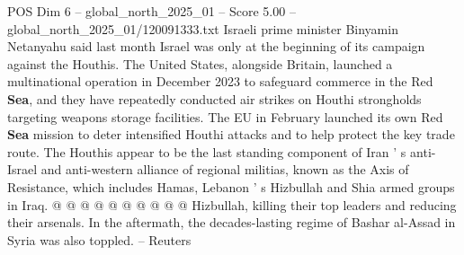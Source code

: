 \begin{textsample}{POS Dim 6 – global\_north\_2025\_01 – Score 5.00 – global\_north\_2025\_01/120091333.txt}
Israeli prime minister Binyamin Netanyahu said last month Israel was only at the beginning of its campaign against the Houthis.
The United States, alongside Britain, launched a multinational operation in December 2023 to safeguard commerce in the Red \textbf{Sea}, and they have repeatedly conducted air strikes on Houthi strongholds targeting weapons storage facilities.
The EU in February launched its own Red \textbf{Sea} mission to deter intensified Houthi attacks and to help protect the key trade route.
The Houthis appear to be the last standing component of Iran ' s anti-Israel and anti-western alliance of regional militias, known as the Axis of Resistance, which includes Hamas, Lebanon ' s Hizbullah and Shia armed groups in Iraq. @ @ @ @ @ @ @ @ @ @ Hizbullah, killing their top leaders and reducing their arsenals.
In the aftermath, the decades-lasting regime of Bashar al-Assad in Syria was also toppled. -- Reuters

\end{textsample}
